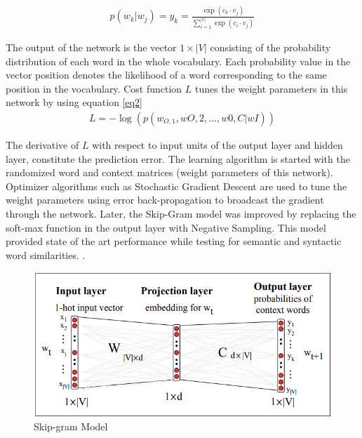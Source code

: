 \documentclass[12pt]{report} %
\begin{document}
\begin{align}
\label{eq1}
p(w_{k} | w_{j}) = y_{k} = \frac{\exp( c_{k} \cdot v_{j})}{\sum_{i=1}^{|v|} \exp(c_{i} \cdot v_{j}) } 
\end{align}


The output of the network is the vector $1\times|V|$ consisting of the probability distribution of each word in the whole vocabulary. Each probability value in the vector position denotes the likelihood of a word corresponding to the same position in the vocabulary. Cost function $L$ tunes the weight parameters in this network by using equation \ref{eq2}
\begin{align}
\label{eq2}
L = - \log ( p(w_{O,1}, wO,2, . . . , w0,C|wI))
\end{align} 


The derivative of $L$ with respect to input units of the output layer and hidden layer, constitute the prediction error. The learning algorithm is started with the randomized word and context matrices (weight parameters of this network). Optimizer algorithms such as Stochastic Gradient Descent are used to tune the weight parameters using error back-propagation to broadcast the gradient through the network. Later, the Skip-Gram model was improved by replacing the soft-max function in the output layer with Negative Sampling. This model provided state of the art performance while testing for semantic and syntactic word similarities. \citep{mikolov2014word2vec}. 


\begin{figure}[!tbp]
	\centering
	\includegraphics[scale=0.50]{image/skip-gram.png}
	\caption{Skip-gram Model \citep{jurafsky2014speech}}
	\label{skipgram}
\end{figure}
\end{document}
